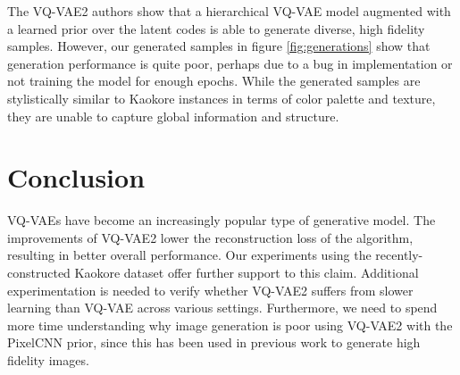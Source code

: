 \documentclass{article}
\begin{document}
The VQ-VAE2 authors show that a hierarchical VQ-VAE model augmented with a learned prior over the latent codes is able to generate diverse, high fidelity samples. However, our generated samples in figure \ref{fig:generations} show that generation performance is quite poor, perhaps due to a bug in implementation or not training the model for enough epochs. While the generated samples are stylistically similar to Kaokore instances in terms of color palette and texture, they are unable to capture global information and structure.

\section{Conclusion}

VQ-VAEs have become an increasingly popular type of generative model. The improvements of VQ-VAE2 lower the reconstruction loss of the algorithm, resulting in better overall performance. Our experiments using the recently-constructed Kaokore dataset offer further support to this claim. Additional experimentation is needed to verify whether VQ-VAE2 suffers from slower learning than VQ-VAE across various settings. Furthermore, we need to spend more time understanding why image generation is poor using VQ-VAE2 with the PixelCNN prior, since this has been used in previous work to generate high fidelity images. 



\end{document}
